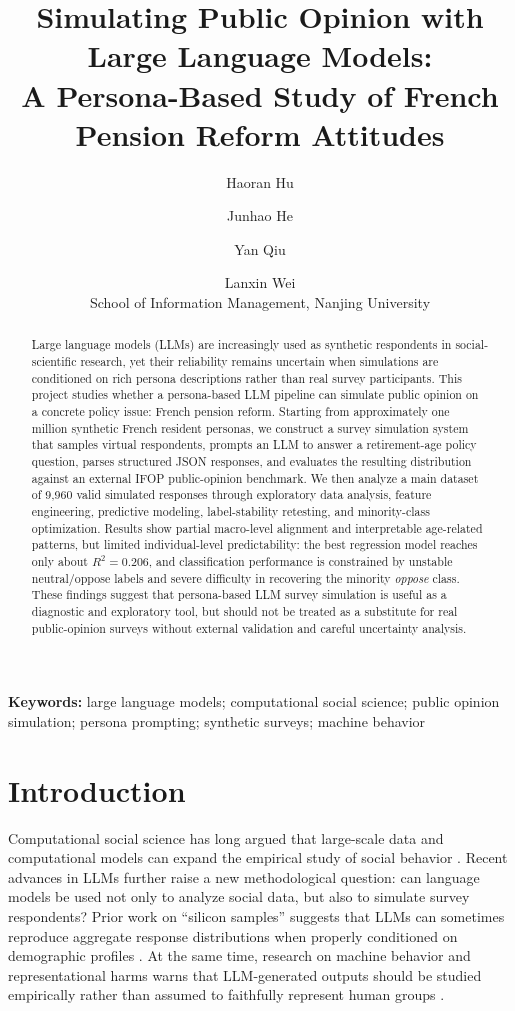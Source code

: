 ﻿\documentclass[10pt,twocolumn]{article}
\title{Simulating Public Opinion with Large Language Models:\\A Persona-Based Study of French Pension Reform Attitudes}
\author{Haoran Hu \and Junhao He \and Yan Qiu \and Lanxin Wei\\School of Information Management, Nanjing University}
\date{}
\begin{document}
\maketitle

\begin{abstract}
Large language models (LLMs) are increasingly used as synthetic respondents in social-scientific research, yet their reliability remains uncertain when simulations are conditioned on rich persona descriptions rather than real survey participants. This project studies whether a persona-based LLM pipeline can simulate public opinion on a concrete policy issue: French pension reform. Starting from approximately one million synthetic French resident personas, we construct a survey simulation system that samples virtual respondents, prompts an LLM to answer a retirement-age policy question, parses structured JSON responses, and evaluates the resulting distribution against an external IFOP public-opinion benchmark. We then analyze a main dataset of 9,960 valid simulated responses through exploratory data analysis, feature engineering, predictive modeling, label-stability retesting, and minority-class optimization. Results show partial macro-level alignment and interpretable age-related patterns, but limited individual-level predictability: the best regression model reaches only about $R^2=0.206$, and classification performance is constrained by unstable neutral/oppose labels and severe difficulty in recovering the minority \textit{oppose} class. These findings suggest that persona-based LLM survey simulation is useful as a diagnostic and exploratory tool, but should not be treated as a substitute for real public-opinion surveys without external validation and careful uncertainty analysis.
\end{abstract}

\noindent\textbf{Keywords:} large language models; computational social science; public opinion simulation; persona prompting; synthetic surveys; machine behavior

\section{Introduction}
Computational social science has long argued that large-scale data and computational models can expand the empirical study of social behavior \cite{lazer2009computational}. Recent advances in LLMs further raise a new methodological question: can language models be used not only to analyze social data, but also to simulate survey respondents? Prior work on ``silicon samples'' suggests that LLMs can sometimes reproduce aggregate response distributions when properly conditioned on demographic profiles \cite{argyle2023out,aher2023using}. At the same time, research on machine behavior and representational harms warns that LLM-generated outputs should be studied empirically rather than assumed to faithfully represent human groups \cite{rahwan2019machine,wang2024replace,cheng2023marked}.
\end{document}

